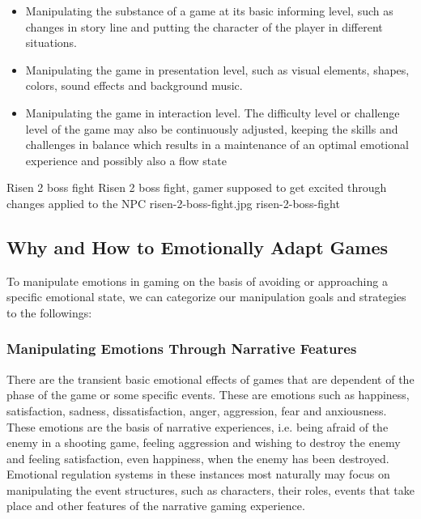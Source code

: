 \begin{itemize}
\item Manipulating the substance of a game at its basic informing level, such as changes in story line and putting the character of the player in different situations.
\item Manipulating the game in presentation level, such as visual elements, shapes, colors, sound effects and background music.
\item Manipulating the game in interaction level. The difficulty level or challenge level of the game may also be continuously adjusted, keeping the skills and challenges in balance which results in a maintenance of an optimal emotional experience and possibly also a flow state ~\cite{saari2005emotional}
\end{itemize}

\largeimg
{Risen 2 boss fight}
{Risen 2 boss fight, gamer supposed to get excited through changes applied to the NPC}
{risen-2-boss-fight.jpg}
{risen-2-boss-fight}

\subsection{Why and How to Emotionally Adapt Games}

To manipulate emotions in gaming on the basis of avoiding or approaching a specific emotional state, we can categorize our manipulation goals and strategies to the followings:

\subsubsection{Manipulating Emotions Through Narrative Features} There are the transient basic emotional effects of games that are dependent of the phase of the game or some specific events. These are emotions such as happiness, satisfaction, sadness, dissatisfaction, anger, aggression, fear and anxiousness. These emotions are the basis of narrative experiences, i.e. being afraid of the enemy in a shooting game, feeling aggression and wishing to destroy the enemy and feeling satisfaction, even happiness, when the enemy has been destroyed. Emotional regulation systems in these instances most naturally may focus on manipulating the event structures, such as characters, their roles, events that take place and other features of the narrative gaming experience. ~\cite{saari2005emotional}

